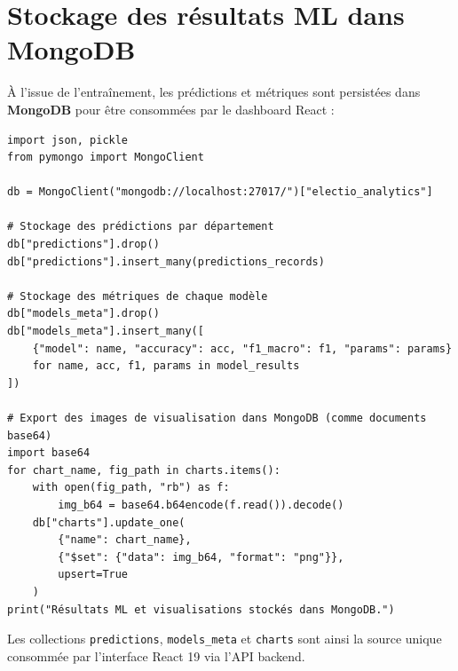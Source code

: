 \section{Stockage des résultats ML dans MongoDB}

À l'issue de l'entraînement, les prédictions et métriques sont persistées dans
\textbf{MongoDB} pour être consommées par le dashboard React :

\begin{verbatim}
import json, pickle
from pymongo import MongoClient

db = MongoClient("mongodb://localhost:27017/")["electio_analytics"]

# Stockage des prédictions par département
db["predictions"].drop()
db["predictions"].insert_many(predictions_records)

# Stockage des métriques de chaque modèle
db["models_meta"].drop()
db["models_meta"].insert_many([
    {"model": name, "accuracy": acc, "f1_macro": f1, "params": params}
    for name, acc, f1, params in model_results
])

# Export des images de visualisation dans MongoDB (comme documents base64)
import base64
for chart_name, fig_path in charts.items():
    with open(fig_path, "rb") as f:
        img_b64 = base64.b64encode(f.read()).decode()
    db["charts"].update_one(
        {"name": chart_name},
        {"$set": {"data": img_b64, "format": "png"}},
        upsert=True
    )
print("Résultats ML et visualisations stockés dans MongoDB.")
\end{verbatim}

\noindent Les collections \texttt{predictions}, \texttt{models\_meta} et \texttt{charts}
sont ainsi la source unique consommée par l'interface React 19 via l'API backend.
